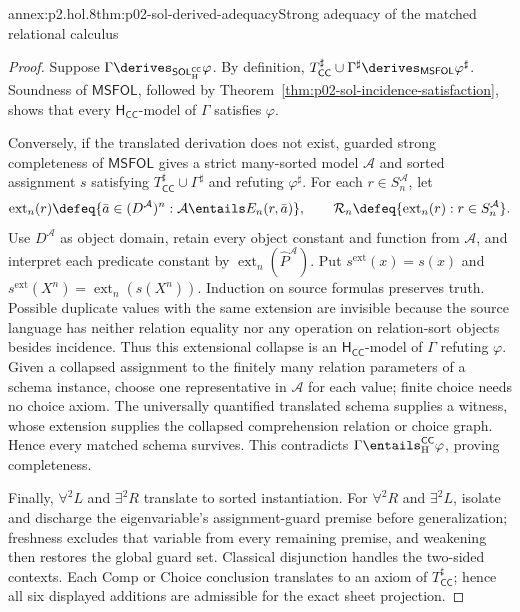 \begin{annexitem}{annex:p2.hol.8}{thm:p02-sol-derived-adequacy}{Strong adequacy of the matched relational calculus}
\begin{proof}
Suppose
\(\Gamma\derives_{\mathsf{SOL}_{\mathrm H}^{\mathsf{CC}}}\varphi\).
By definition,
\(T_{\mathsf{CC}}^\sharp\cup\Gamma^\sharp
\derives_{\mathsf{MSFOL}}\varphi^\sharp\).  Soundness of
\(\mathsf{MSFOL}\), followed by
Theorem~\ref{thm:p02-sol-incidence-satisfaction}, shows that every
\(\mathsf H_{\mathsf{CC}}\)-model of \(\Gamma\) satisfies \(\varphi\).

Conversely, if the translated derivation does not exist, guarded strong
completeness of \(\mathsf{MSFOL}\) gives a strict many-sorted model
\(\mathcal A\) and sorted assignment \(s\) satisfying
\(T_{\mathsf{CC}}^\sharp\cup\Gamma^\sharp\) and refuting
\(\varphi^\sharp\).  For each \(r\in S_n^{\mathcal A}\), let
\[
 \operatorname{ext}_n(r)\defeq
 \{\bar a\in(D^{\mathcal A})^n:
   \mathcal A\entails E_n(r,\bar a)\},
 \qquad
 \mathcal R_n\defeq
 \{\operatorname{ext}_n(r):r\in S_n^{\mathcal A}\}.
\]
Use \(D^{\mathcal A}\) as object domain, retain every object constant and
function from \(\mathcal A\), and interpret each predicate constant by
\(\operatorname{ext}_n(\widehat P^{\mathcal A})\).  Put
\(s^{\mathrm{ext}}(x)=s(x)\) and
\(s^{\mathrm{ext}}(X^n)=\operatorname{ext}_n(s(X^n))\).  Induction on source
formulas preserves truth.  Possible duplicate values with the same extension are
invisible because the source language has neither relation equality nor any
operation on relation-sort objects besides incidence.  Thus this extensional
collapse is an \(\mathsf H_{\mathsf{CC}}\)-model of \(\Gamma\) refuting
\(\varphi\).  Given a collapsed assignment to the finitely many relation
parameters of a schema instance, choose one representative in \(\mathcal A\)
for each value; finite choice needs no choice axiom.  The universally quantified
translated schema supplies a witness, whose extension supplies the collapsed
comprehension relation or choice graph.  Hence every matched schema survives.
This
contradicts \(\Gamma\entails_{\mathrm H}^{\mathsf{CC}}\varphi\), proving
completeness.

Finally, \(\forall^2L\) and \(\exists^2R\) translate to sorted
instantiation.  For \(\forall^2R\) and \(\exists^2L\), isolate and discharge
the eigenvariable's assignment-guard premise before generalization; freshness
excludes that variable from every remaining premise, and weakening then
restores the global guard set.
Classical disjunction handles the two-sided contexts.  Each Comp or Choice
conclusion translates to an axiom of \(T_{\mathsf{CC}}^\sharp\); hence all
six displayed additions are admissible for the exact sheet projection.
\end{proof}
\end{annexitem}

